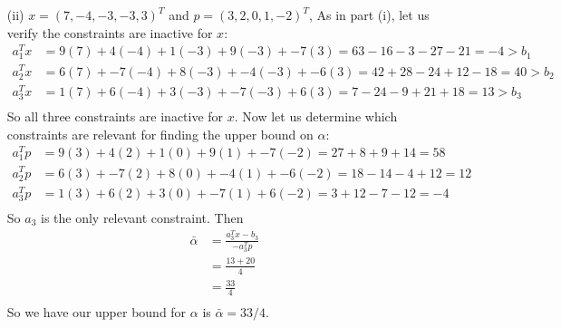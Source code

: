 \documentclass{article}
\begin{document}
\begin{itemize}
        \item[(ii)] $x = (7,-4,-3,-3,3)^T$ and $p = (3,2,0,1,-2)^T$,
        \newline\newline
        As in part (i), let us verify the constraints are inactive for $x$:
        \begin{align*}
            a_1^Tx &= 9(7) + 4(-4) + 1(-3) + 9(-3) + -7(3) = 63 - 16 - 3 - 27 - 21 = -4 > b_1\\
            a_2^Tx &= 6(7) + -7(-4) + 8(-3) + -4(-3) + -6(3) = 42 + 28 - 24 + 12 - 18 = 40 > b_2 \\
            a_3^Tx &= 1(7) + 6(-4) + 3(-3) + -7(-3) + 6(3) = 7 - 24 - 9 + 21 + 18 = 13 > b_3 \\
        \end{align*}
        So all three constraints are inactive for $x$. Now let us determine which constraints are relevant for finding the upper bound on $\alpha$:
        \begin{align*}
            a_1^Tp &= 9(3) + 4(2) + 1(0) + 9(1) + -7(-2) = 27 + 8 + 9 + 14 = 58 \\
            a_2^Tp &= 6(3) + -7(2) + 8(0) + -4(1) + -6(-2) = 18 - 14 - 4 + 12 = 12\\
            a_3^Tp &= 1(3) + 6(2) + 3(0) + -7(1) + 6(-2) = 3 + 12 - 7 - 12 = -4\\
        \end{align*}
        So $a_3$ is the only relevant constraint. Then
        \begin{align*}
            \bar{\alpha} &= \frac{a_3^Tx - b_3}{-a_3^Tp} \\
            &= \frac{13 + 20}{4} \\
            &= \frac{33}{4} \\
        \end{align*}
        So we have our upper bound for $\alpha$ is $\bar{\alpha} = 33/4$.


\end{itemize}
\end{document}

